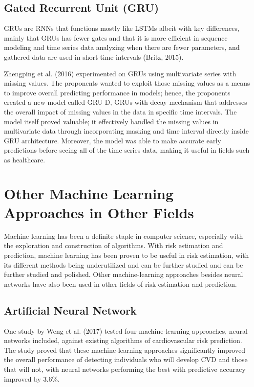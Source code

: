 \documentclass[10pt,11pt,12pt,oneside]{book}
\begin{document}
        \subsection{Gated Recurrent Unit (GRU)}
        GRUs are RNNs that functions mostly like LSTMs albeit with key differences, mainly that GRUs has fewer gates and that it is more efficient in sequence modeling and time series data analyzing when there are fewer parameters, and gathered data are used in short-time intervals (Britz, 2015). \cite{britz_2016}
        
        Zhengping et al. (2016) experimented on GRUs using multivariate series with missing values. The proponents wanted to exploit those missing values as a means to improve overall predicting performance in models; hence, the proponents created a new model called GRU-D, GRUs with decay mechanism that addresses the overall impact of missing values in the data in specific time intervals. The model itself proved valuable; it effectively handled the missing values in multivariate data through incorporating masking and time interval directly inside GRU architecture. Moreover, the model was able to make accurate early predictions before seeing all of the time series data, making it useful in fields such as healthcare. \cite{DBLP:journals/corr/ChePCSL16}
    \section{Other Machine Learning Approaches in Other Fields}
    Machine learning has been a definite staple in computer science, especially with the exploration and construction of algorithms. With risk estimation and prediction, machine learning has been proven to be useful in risk estimation, with its different methods being underutilized and can be further studied and can be further studied and polished. \cite{Kruppa2012} Other machine-learning approaches besides neural networks have also been used in other fields of risk estimation and prediction. 
        \subsection{Artificial Neural Network}
        One study by Weng et al. (2017) tested four machine-learning approaches, neural networks included, against existing algorithms of cardiovascular risk prediction. The study proved that these machine-learning approaches significantly improved the overall performance of detecting individuals who will develop CVD and those that will not, with neural networks performing the best with predictive accuracy improved by 3.6\%. \cite{Weng2017}
\end{document}
